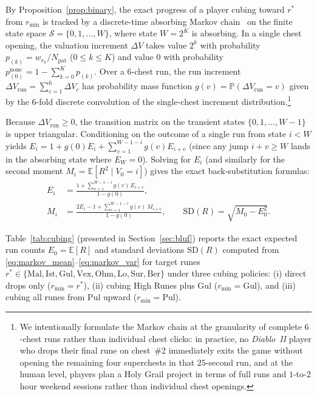 \documentclass[11pt,reqno]{amsart}
\theoremstyle{definition}
\begin{document}
By Proposition~\ref{prop:binary}, the exact progress of a player cubing toward $r^*$ from $r_{\min}$ is tracked by a discrete-time absorbing Markov chain~\cite{kemeny_snell} on the finite state space $\mathcal{S} = \{0, 1, \dots, W\}$, where state $W = 2^K$ is absorbing. In a single chest opening, the valuation increment $\Delta V$ takes value $2^k$ with probability $p_{(k)} = w_{r_k} / N_{\text{pat}}$ ($0 \le k \le K$) and value $0$ with probability $p_{(0)}^{\text{none}} = 1 - \sum_{k=0}^K p_{(k)}$. Over a $6$-chest run, the run increment $\Delta V_{\text{run}} = \sum_{c=1}^6 \Delta V_c$ has probability mass function $g(v) = \mathbb{P}(\Delta V_{\text{run}} = v)$ given by the $6$-fold discrete convolution of the single-chest increment distribution.\footnote{We intentionally formulate the Markov chain at the granularity of complete $6$-chest runs rather than individual chest clicks: in practice, no \emph{Diablo~II} player who drops their final rune on chest~\#2 immediately exits the game without opening the remaining four superchests in that $25$-second run, and at the human level, players plan a Holy Grail project in terms of full runs and $1$-to-$2$ hour weekend sessions rather than individual chest openings.}

Because $\Delta V_{\text{run}} \ge 0$, the transition matrix on the transient states $\{0, 1, \dots, W-1\}$ is upper triangular. Conditioning on the outcome of a single run from state $i < W$ yields $E_i = 1 + g(0) E_i + \sum_{v=1}^{W-1-i} g(v) E_{i+v}$ (since any jump $i + v \ge W$ lands in the absorbing state where $E_W = 0$). Solving for $E_i$ (and similarly for the second moment $M_i = \mathbb{E}[R^2 \mid V_0 = i]$) gives the exact back-substitution formulas:
\begin{align}
\label{eq:markov_mean}
    E_i &= \frac{1 + \sum_{v=1}^{W-1-i} g(v)\, E_{i+v}}{1 - g(0)}, \\
\label{eq:markov_var}
    M_i &= \frac{2 E_i - 1 + \sum_{v=1}^{W-1-i} g(v)\, M_{i+v}}{1 - g(0)}, \qquad \text{SD}(R) = \sqrt{M_0 - E_0^2}.
\end{align}

Table~\ref{tab:cubing} (presented in Section~\ref{sec:bluf}) reports the exact expected run counts $E_0 = \mathbb{E}[R]$ and standard deviations $\text{SD}(R)$ computed from \eqref{eq:markov_mean}--\eqref{eq:markov_var} for target runes $r^* \in \{\text{Mal}, \text{Ist}, \text{Gul}, \text{Vex}, \text{Ohm}, \text{Lo}, \text{Sur}, \text{Ber}\}$ under three cubing policies: (i) direct drops only ($r_{\min} = r^*$), (ii) cubing High Runes plus Gul ($r_{\min} = \text{Gul}$), and (iii) cubing all runes from Pul upward ($r_{\min} = \text{Pul}$).
\end{document}
